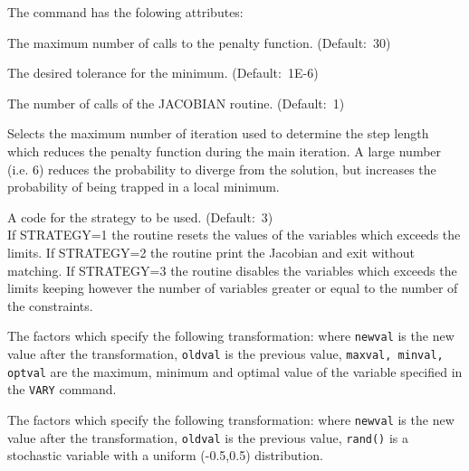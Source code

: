 The command has the folowing attributes: 
\begin{madlist}
   The maximum number of calls to the penalty
  function. (Default:~30)  

   The desired tolerance for the minimum. 
  (Default:~1E-6)

   The number of calls of the JACOBIAN routine. 
  (Default:~1) 

   Selects the maximum number of iteration used to
  determine the step length which reduces the penalty function during
  the main iteration. A large number (i.e. 6) reduces the probability
  to diverge from the solution, but increases the probability of being
  trapped in a local minimum.  

   A code for the strategy to be used. (Default:~3)\\
  If STRATEGY=1 the routine resets the values of the variables which
  exceeds the limits. If STRATEGY=2 the routine print the Jacobian
  and exit without matching. If STRATEGY=3 the routine  disables the
  variables which exceeds the limits keeping however the number of
  variables greater or equal to the number of the constraints.  

   The factors which specify the following
  transformation: 
  where {\tt newval} is the new value after the transformation,
  {\tt oldval} is the previous value, {\tt maxval, minval,
    optval} are the maximum, minimum and optimal value of
   the variable specified in the {\tt VARY} command. 

    The factors which specify the following transformation:
   where {\tt newval} is the new value after the transformation,
   {\tt oldval} is the previous value, {\tt rand()} is a stochastic
   variable with a uniform (-0.5,0.5) distribution.   
\end{madlist} 




